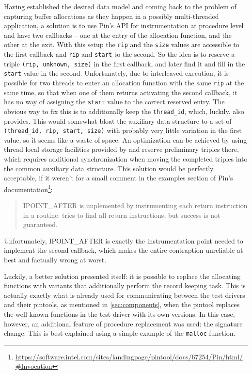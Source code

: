 Having established the desired data model and coming back to the problem of capturing buffer allocations as they
happen in a possibly multi-threaded application, a solution is to use {\small Pin's} API for instrumentation
at procedure level and have two callbacks -- one at the entry of the allocation function, and the other at the
exit. With this setup the \texttt{rip} and the \texttt{size} values are accessible to the first callback and
\texttt{rip} and \texttt{start} to the second. So the idea is to reserve a triple \texttt{(rip, unknown, size)}
in the first callback, and later find it and fill in the \texttt{start} value in the second. Unfortunately, due
to interleaved execution, it is possible for two threads to enter an allocation function with the same
\texttt{rip} at the same time, so that when one of them returns activating the second callback, it has no way
of assigning the \texttt{start} value to the correct reserved entry. The obvious way to fix this is to
additionally keep the \texttt{thread\_id}, which, luckily, \pin also provides. This would somewhat bloat the
auxiliary data structure to a set of \texttt{(thread\_id, rip, start, size)} with probably very little
variation in the first value, so it seems like a waste of space. An optimization can be achieved by using
thread local storage facilities provided by \pin and reserve preliminary triples there, which requires
additional synchronization when moving the completed triples into the common auxiliary data structure. This
solution would be perfectly acceptable, if it weren't for a small comment in the examples section of Pin's
documentation\footnote{\url{https://software.intel.com/sites/landingpage/pintool/docs/67254/Pin/html/\#Invocation}}:
\begin{quote}
{\small IPOINT\_AFTER} is implemented by instrumenting each return instruction in a routine. \pin tries to find
all return instructions, but success is not guaranteed.
\end{quote}
Unfortunately, {\small IPOINT\_AFTER} is exactly the instrumentation point needed to implement the second
callback, which makes the entire contraption unreliable at best and factually wrong at worst.

Luckily, a better solution presented itself: it is possible to replace the allocating functions with variants
that additionally perform the record keeping task.
This is actually exactly what is already used for communicating between the test drivers and their pintools, as
mentioned in \cref{sec:components}, when the pintool replaces the well known functions in the test driver with
its own versions. In this case, however, an additional feature of procedure replacement was used: the signature
change. This is best explained using a simple example of the \texttt{malloc} function.

